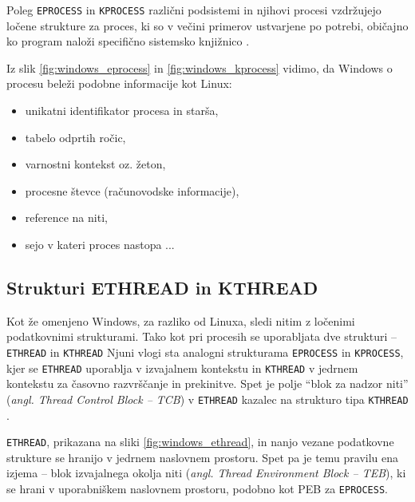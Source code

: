 \documentclass[a4paper,12pt,openright]{book}
\begin{document}
Poleg \texttt{EPROCESS} in \texttt{KPROCESS} različni podsistemi in njihovi procesi vzdr\-žu\-je\-jo ločene strukture za proces, ki so v večini primerov ustvarjene po potrebi, običajno ko program naloži specifično sistemsko knjižnico \cite{Yosifovich_Russinovich_Solomon_Ionescu_2017}.

Iz slik \ref{fig:windows_eprocess} in \ref{fig:windows_kprocess} vidimo, da Windows o procesu beleži podobne informacije kot Linux:
\begin{itemize}
	\item unikatni identifikator procesa in starša,
	\item tabelo odprtih ročic,
	\item varnostni kontekst oz. žeton,
	\item procesne števce (računovodske informacije),
	\item reference na niti,
	\item sejo v kateri proces nastopa ...
\end{itemize}

\subsection{Strukturi ETHREAD in KTHREAD} \label{ssec:windows_process:ethread}

Kot že omenjeno Windows, za razliko od Linuxa, sledi nitim z ločenimi podatkovnimi strukturami.
Tako kot pri procesih se uporabljata dve strukturi -- \texttt{ETHREAD} in \texttt{KTHREAD} \cite{Yosifovich_Russinovich_Solomon_Ionescu_2017}
Njuni vlogi sta analogni strukturama \texttt{EPROCESS} in \texttt{KPROCESS}, kjer se \texttt{ETHREAD} uporablja v izvajalnem kontekstu in \texttt{KTHREAD} v jedrnem kontekstu za časovno razvrščanje in prekinitve.
Spet je polje ``blok za nadzor niti'' (\textit{angl. Thread Control Block -- TCB}) v \texttt{ETHREAD} kazalec na strukturo tipa \texttt{KTHREAD} \cite{Yosifovich_Russinovich_Solomon_Ionescu_2017}.

\texttt{ETHREAD}, prikazana na sliki \ref{fig:windows_ethread}, in nanjo vezane podatkovne strukture se hranijo v jedrnem naslovnem prostoru.
Spet pa je temu pravilu ena izjema -- blok izvajalnega okolja niti (\textit{angl. Thread Environment Block -- TEB}), ki se hrani v uporabniškem naslovnem prostoru, podobno kot PEB za \texttt{EPROCESS}.
\end{document}
